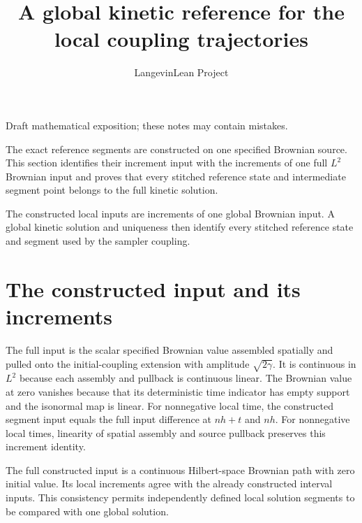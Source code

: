 \documentclass[11pt,a4paper]{article}
\title{\texorpdfstring{A global kinetic reference for the local coupling trajectories}{A global kinetic reference for the local coupling trajectories}}
\author{LangevinLean Project}
\date{}
\begin{document}
\maketitle
Draft mathematical exposition; these notes may contain mistakes.


The exact reference segments are constructed on one specified Brownian source. This section identifies their increment input with the increments of one full \(L^{2}\) Brownian input and proves that every stitched reference state and intermediate segment point belongs to the full kinetic solution.



The constructed local inputs are increments of one global Brownian input. A global kinetic solution and uniqueness then identify every stitched reference state and segment used by the sampler coupling.


\section{\texorpdfstring{The constructed input and its increments}{The constructed input and its increments}}


The full input is the scalar specified Brownian value assembled spatially and pulled onto the initial-coupling extension with amplitude \(\sqrt{2\gamma}\). It is continuous in \(L^{2}\) because each assembly and pullback is continuous linear. The Brownian value at zero vanishes because that its deterministic time indicator has empty support and the isonormal map is linear. For nonnegative local time, the constructed segment input equals the full input difference at \(nh+t\) and \(nh\). For nonnegative local times, linearity of spatial assembly and source pullback preserves this increment identity.



The full constructed input is a continuous Hilbert-space Brownian path with zero initial value. Its local increments agree with the already constructed interval inputs. This consistency permits independently defined local solution segments to be compared with one global solution.
\end{document}
